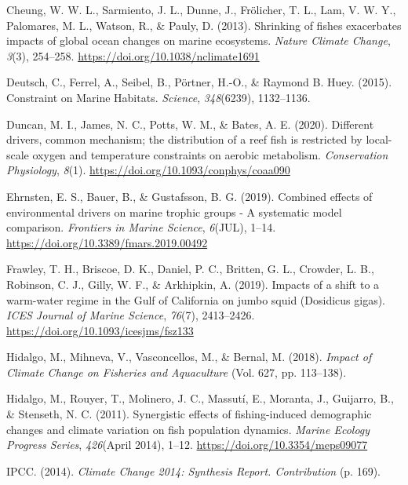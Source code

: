 \documentclass[
]{article}
\newlength{\cslhangindent}
\newenvironment{cslreferences}%
  {\setlength{\parindent}{0pt}%
  \everypar{\setlength{\hangindent}{\cslhangindent}}\ignorespaces}%
  {\par}
\begin{document}
\begin{cslreferences}
\leavevmode\hypertarget{ref-Cheung2013}{}%
Cheung, W. W. L., Sarmiento, J. L., Dunne, J., Frölicher, T. L., Lam, V.
W. Y., Palomares, M. L., Watson, R., \& Pauly, D. (2013). Shrinking of
fishes exacerbates impacts of global ocean changes on marine ecosystems.
\emph{Nature Climate Change}, \emph{3}(3), 254--258.
\url{https://doi.org/10.1038/nclimate1691}

\leavevmode\hypertarget{ref-Deutsch2015}{}%
Deutsch, C., Ferrel, A., Seibel, B., Pörtner, H.-O., \& Raymond B. Huey.
(2015). Constraint on Marine Habitats. \emph{Science}, \emph{348}(6239),
1132--1136.

\leavevmode\hypertarget{ref-Duncan2020}{}%
Duncan, M. I., James, N. C., Potts, W. M., \& Bates, A. E. (2020).
Different drivers, common mechanism; the distribution of a reef fish is
restricted by local-scale oxygen and temperature constraints on aerobic
metabolism. \emph{Conservation Physiology}, \emph{8}(1).
\url{https://doi.org/10.1093/conphys/coaa090}

\leavevmode\hypertarget{ref-Ehrnsten2019}{}%
Ehrnsten, E. S., Bauer, B., \& Gustafsson, B. G. (2019). Combined
effects of environmental drivers on marine trophic groups - A systematic
model comparison. \emph{Frontiers in Marine Science}, \emph{6}(JUL),
1--14. \url{https://doi.org/10.3389/fmars.2019.00492}

\leavevmode\hypertarget{ref-Frawley2019}{}%
Frawley, T. H., Briscoe, D. K., Daniel, P. C., Britten, G. L., Crowder,
L. B., Robinson, C. J., Gilly, W. F., \& Arkhipkin, A. (2019). Impacts
of a shift to a warm-water regime in the Gulf of California on jumbo
squid (Dosidicus gigas). \emph{ICES Journal of Marine Science},
\emph{76}(7), 2413--2426. \url{https://doi.org/10.1093/icesjms/fsz133}

\leavevmode\hypertarget{ref-Hidalgo2018}{}%
Hidalgo, M., Mihneva, V., Vasconcellos, M., \& Bernal, M. (2018).
\emph{Impact of Climate Change on Fisheries and Aquaculture} (Vol. 627,
pp. 113--138).

\leavevmode\hypertarget{ref-Hidalgo2011}{}%
Hidalgo, M., Rouyer, T., Molinero, J. C., Massutí, E., Moranta, J.,
Guijarro, B., \& Stenseth, N. C. (2011). Synergistic effects of
fishing-induced demographic changes and climate variation on fish
population dynamics. \emph{Marine Ecology Progress Series},
\emph{426}(April 2014), 1--12. \url{https://doi.org/10.3354/meps09077}

\leavevmode\hypertarget{ref-IPCC2014}{}%
IPCC. (2014). \emph{Climate Change 2014: Synthesis Report. Contribution}
(p. 169).


\end{cslreferences}
\end{document}
